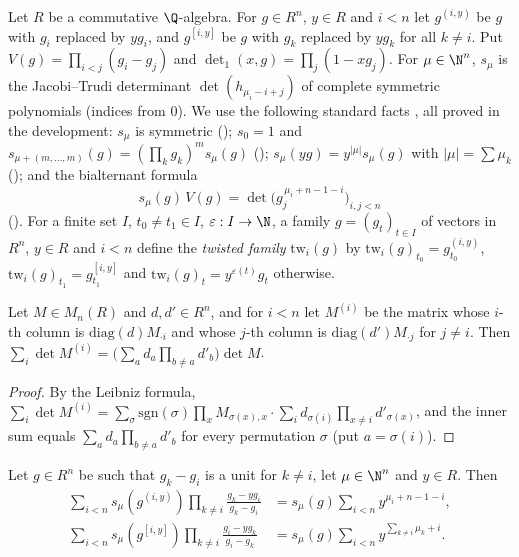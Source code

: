 Let $R$ be a commutative $\Q$-algebra. For $g\in R^n$, $y\in R$ and $i<n$ let $g^{(i,y)}$ be $g$ with $g_i$ replaced by $yg_i$, and
$g^{[i,y]}$ be $g$ with $g_k$ replaced by $yg_k$ for all $k\neq i$. Put $V(g)=\prod_{i<j}(g_i-g_j)$ and
$\det\nolimits_1(x,g)=\prod_j(1-xg_j)$. For $\mu\in\N^n$, $s_\mu$ is the Jacobi--Trudi determinant $\det(h_{\mu_i-i+j})$ of complete
symmetric polynomials (indices from $0$). We use the following standard facts \cite[Ch.~I, \S3]{Macdonald1995}, all proved in the
development: $s_\mu$ is symmetric (); $s_0=1$ and
$s_{\mu+(m,\dots,m)}(g)=(\prod_kg_k)^m s_\mu(g)$ (); $s_\mu(yg)=y^{|\mu|}s_\mu(g)$ with
$|\mu|=\sum\mu_k$ (); and the bialternant formula
\begin{equation}\label{pf:ks1:eq-bialt}
s_\mu(g)\,V(g)=\det\bigl(g_j^{\,\mu_i+n-1-i}\bigr)_{i,j<n}
\end{equation}
(). For a finite set $I$, $t_0\neq t_1\in I$, $\varepsilon:I\to\N$, a family $g=(g_t)_{t\in I}$ of
vectors in $R^n$, $y\in R$ and $i<n$ define the \emph{twisted family} $\mathrm{tw}_i(g)$ by $\mathrm{tw}_i(g)_{t_0}=g_{t_0}^{(i,y)}$,
$\mathrm{tw}_i(g)_{t_1}=g_{t_1}^{[i,y]}$ and $\mathrm{tw}_i(g)_t=y^{\varepsilon(t)}g_t$ otherwise.

\begin{lemma}\label{pf:ks1:lem-mixdet}
Let $M\in M_n(R)$ and $d,d'\in R^n$, and for $i<n$ let $M^{(i)}$ be the matrix whose $i$-th column is $\mathrm{diag}(d)M_{\cdot i}$ and whose
$j$-th column is $\mathrm{diag}(d')M_{\cdot j}$ for $j\neq i$. Then $\sum_i\det M^{(i)}=\bigl(\sum_ad_a\prod_{b\neq a}d'_b\bigr)\det M$.
\end{lemma}

\begin{proof}
By the Leibniz formula, $\sum_i\det M^{(i)}=\sum_\sigma\mathrm{sgn}(\sigma)\prod_xM_{\sigma(x),x}\cdot\sum_id_{\sigma(i)}\prod_{x\neq i}d'_{\sigma(x)}$, and
the inner sum equals $\sum_ad_a\prod_{b\neq a}d'_b$ for every permutation $\sigma$ (put $a=\sigma(i)$).
\end{proof}

\begin{lemma}\label{pf:ks1:lem-schury}
Let $g\in R^n$ be such that $g_k-g_i$ is a unit for $k\neq i$, let $\mu\in\N^n$ and $y\in R$. Then
\begin{align}
\sum_{i<n}s_\mu(g^{(i,y)})\prod_{k\neq i}\frac{g_k-yg_i}{g_k-g_i}&=s_\mu(g)\sum_{i<n}y^{\mu_i+n-1-i},\label{pf:ks1:eq-schury}\\
\sum_{i<n}s_\mu(g^{[i,y]})\prod_{k\neq i}\frac{g_i-yg_k}{g_i-g_k}&=s_\mu(g)\sum_{i<n}y^{\sum_{k\neq i}\mu_k+i}.\label{pf:ks1:eq-schuryoff}
\end{align}
\end{lemma}

